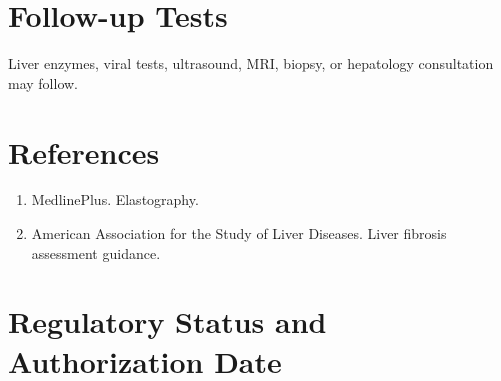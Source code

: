 \section*{Follow-up Tests} Liver enzymes, viral tests, ultrasound, MRI, biopsy, or hepatology consultation may follow.
\section*{References} \begin{enumerate}\item MedlinePlus. Elastography.\item American Association for the Study of Liver Diseases. Liver fibrosis assessment guidance.\end{enumerate}
\clearpage\section*{Regulatory Status and Authorization Date}\clearpage
